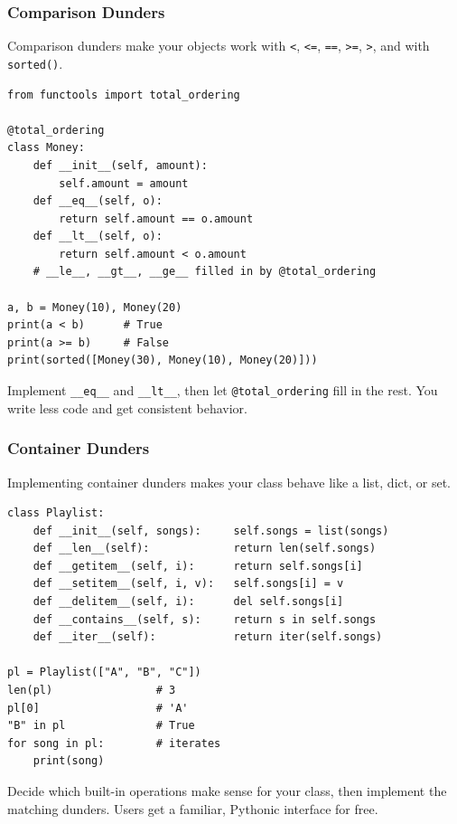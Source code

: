 \documentclass[aspectratio=169,10pt]{beamer}
\newcommand{\codeword}[1]{\texttt{#1}}
\newenvironment{bluebox}[1]{%
  \vspace{0.08cm}\begin{tcolorbox}[lecturebox,title={#1},fontupper=\small]%
}{\end{tcolorbox}\vspace{0.05cm}}
\begin{document}
\begin{frame}[fragile]
\frametitle{Comparison Dunders}
\small
Comparison dunders make your objects work with \codeword{<}, \codeword{<=}, \codeword{==}, \codeword{>=}, \codeword{>}, and with \codeword{sorted()}.

\vspace{0.12cm}
\begin{lstlisting}[style=pycode]
from functools import total_ordering

@total_ordering
class Money:
    def __init__(self, amount):
        self.amount = amount
    def __eq__(self, o):
        return self.amount == o.amount
    def __lt__(self, o):
        return self.amount < o.amount
    # __le__, __gt__, __ge__ filled in by @total_ordering

a, b = Money(10), Money(20)
print(a < b)      # True
print(a >= b)     # False
print(sorted([Money(30), Money(10), Money(20)]))
\end{lstlisting}

\begin{tcolorbox}[lecturebox,title=Tip]
Implement \codeword{\_\_eq\_\_} and \codeword{\_\_lt\_\_}, then let \codeword{@total\_ordering} fill in the rest. You write less code and get consistent behavior.
\end{tcolorbox}
\end{frame}


\begin{frame}[fragile]
\frametitle{Container Dunders}
\small
Implementing container dunders makes your class behave like a list, dict, or set.

\vspace{0.1cm}
\begin{lstlisting}[style=pycode]
class Playlist:
    def __init__(self, songs):     self.songs = list(songs)
    def __len__(self):             return len(self.songs)
    def __getitem__(self, i):      return self.songs[i]
    def __setitem__(self, i, v):   self.songs[i] = v
    def __delitem__(self, i):      del self.songs[i]
    def __contains__(self, s):     return s in self.songs
    def __iter__(self):            return iter(self.songs)

pl = Playlist(["A", "B", "C"])
len(pl)                # 3
pl[0]                  # 'A'
"B" in pl              # True
for song in pl:        # iterates
    print(song)
\end{lstlisting}

\begin{bluebox}{The pattern}
Decide which built-in operations make sense for your class, then implement the matching dunders. Users get a familiar, Pythonic interface for free.
\end{bluebox}
\end{frame}
\end{document}
